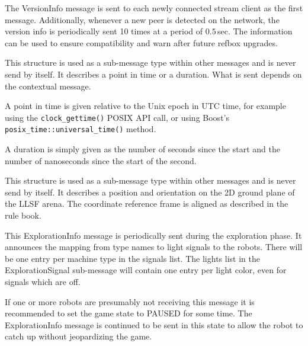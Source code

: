 \documentclass[a4paper]{article}
\begin{document}
%
{%
  The VersionInfo message is sent to each newly connected stream
  client as the first message. Additionally, whenever a new peer is
  detected on the network, the version info is periodically sent 10
  times at a period of $0.5$\,sec. The information can be used to
  ensure compatibility and warn after future refbox upgrades.
}

%
{%
  This structure is used as a sub-message type within other messages
  and is never send by itself. It describes a point in time or a
  duration. What is sent depends on the contextual message.

  \medskip

  A point in time is given relative to the Unix epoch in UTC time, for
  example using the \texttt{clock\_gettime()} POSIX API call, or using
  Boost's \texttt{posix\_time::universal\_time()} method.

  \medskip

  A duration is simply given as the number of seconds since the start
  and the number of nanoseconds since the start of the second.
}

%
{%
  This structure is used as a sub-message type within other messages
  and is never send by itself. It describes a position and orientation
  on the 2D ground plane of the LLSF arena. The coordinate reference
  frame is aligned as described in the rule book.
}

%
{%
  This ExplorationInfo message is periodically sent during the
  exploration phase. It announces the mapping from type names to light
  signals to the robots. There will be one entry per machine type in
  the signals list. The lights list in the ExplorationSignal
  sub-message will contain one entry per light color, even for signals
  which are off.

  \medskip
  If one or more robots are presumably not receiving this message it
  is recommended to set the game state to PAUSED for some time. The
  ExplorationInfo message is continued to be sent in this state to
  allow the robot to catch up without jeopardizing the game.
}
\end{document}
